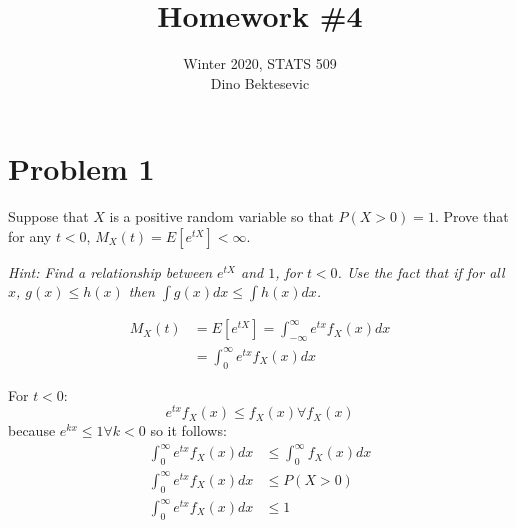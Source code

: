 \documentclass{article}
\date{{}}
\newcommand{\1}{\mathbf{1}}
\begin{document}
\title{Homework \#4}
\author{\normalsize{Winter 2020, STATS 509}\\
\normalsize{Dino Bektesevic}}
\maketitle

\section*{Problem 1}
Suppose that $X$ is a positive random variable so that 
$P(X > 0) = 1$. Prove that for any $t<0$, $M_X(t) = E[e^{tX}] < \infty$.

\emph{Hint: Find a relationship between $e^{tX}$ and $1$, for $t < 0$.
Use the fact that if for all $x$, $g(x) \leq h(x)$ then $\int g(x) dx \leq \int h(x)dx$.}

\begin{align*}
    M_X(t)  &= E[e^{tX}] = \int_{-\infty}^\infty e^{tx} f_X(x) dx \\
    &= \int_0^\infty e^{tx} f_X(x) dx
\end{align*}

For $t<0$:
$$ e^{tx} f_X(x) \leq f_X(x) \forall f_X(x)$$
because $e^{kx}\leq 1 \forall k<0$ so it follows:
\begin{align*}
    \int_0^\infty e^{tx} f_X(x) dx &\leq \int_0^\infty f_X(x) dx \\
     \int_0^\infty e^{tx} f_X(x) dx &\leq P(X>0) \\
      \int_0^\infty e^{tx} f_X(x) dx &\leq 1
\end{align*}




\newpage
\end{document}
